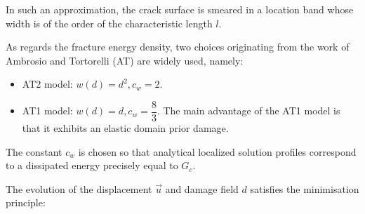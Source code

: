 
In such an approximation, the crack surface is smeared in a location
band whose width is of the order of the characteristic length \(l\).

As regards the fracture energy density, two choices originating from the
work of Ambrosio and Tortorelli (AT) are widely used, namely:

\begin{itemize}
    \item AT2 model: \(w(d) = d^2, c_w=2\).
    \item AT1 model: \(w(d) = d, c_w=\dfrac{8}{3}\). The main advantage of the AT1 model is that it exhibits an elastic domain prior damage.
\end{itemize}

The constant $c_w$ is chosen so that analytical localized solution
profiles correspond to a dissipated energy precisely equal to $G_c$.

The evolution of the displacement \(\vec{u}\) and damage field \(d\)
satisfies the minimisation principle:

